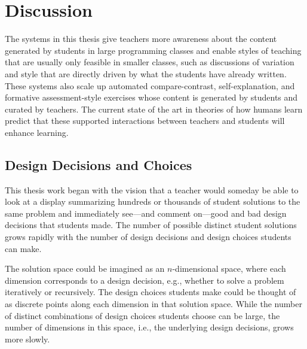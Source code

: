 \chapter{Discussion}\label{chapter:discussion}

The systems in this thesis give teachers more awareness about the content generated by students in large programming classes and enable styles of teaching that are usually only feasible in smaller classes, such as discussions of variation and style that are directly driven by what the students have already written. These systems also scale up automated compare-contrast, self-explanation, and formative assessment-style exercises whose content is generated by students and curated by teachers. The current state of the art in theories of how humans learn predict that these supported interactions between teachers and students will enhance learning.

\section{Design Decisions and Choices}


This thesis work began with the vision that a teacher would someday be able to look at a display summarizing hundreds or thousands of student solutions to the same problem and immediately see---and comment on---good and bad design decisions that students made. The number of possible distinct student solutions grows rapidly with the number of design decisions and design choices students can make. 

The solution space could be imagined as an $n$-dimensional space, where each dimension corresponds to a design decision, e.g., whether to solve a problem iteratively or recursively. The design choices students make could be thought of as discrete points along each dimension in that solution space. While the number of distinct combinations of design choices students choose can be large, the number of dimensions in this space, i.e., the underlying design decisions, grows more slowly. 

